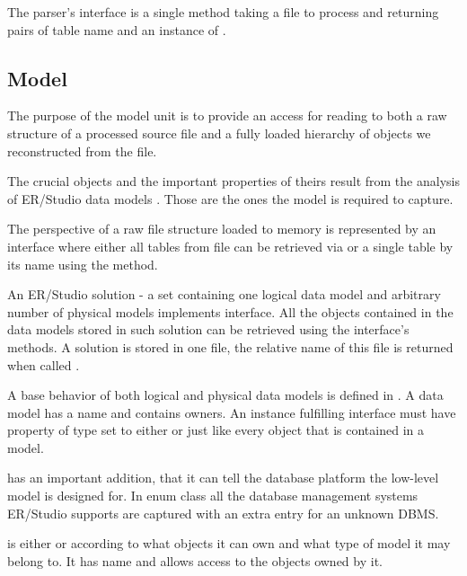 
The parser's interface is a single method  taking a file to process and returning pairs of table name and an instance of .

\subsection{Model}

The purpose of the model unit is to provide an access for reading to both a raw structure of a processed source file and a fully loaded hierarchy of objects we reconstructed from the file.

The crucial objects and the important properties of theirs result from the analysis of ER/Studio data models . Those are the ones the model is required to capture.

The perspective of a raw file structure loaded to memory is represented by an interface  where either all tables from file can be retrieved via  or a single table by its name using the  method.

An ER/Studio solution - a set containing one logical data model and arbitrary number of physical models implements  interface. All the objects contained in the data models stored in such solution can be retrieved using the interface's methods. A solution is stored in one file, the relative name of this file is returned when called .


A base behavior of both logical and physical data models is defined in .
A data model has a name and contains owners. An instance fulfilling  interface must have property of type  set to either  or  just like every object that is contained in a model.

 has an important addition, that it can tell the database platform the low-level model is designed for. In enum class  all the database management systems ER/Studio supports are captured with an extra entry for an unknown DBMS.

 is either  or  according to what objects it can own and what type of model it may belong to. 
It has name and allows access to the objects owned by it.

